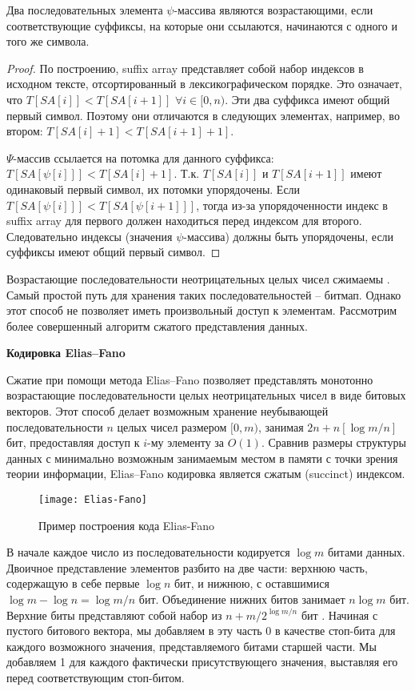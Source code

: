 \begin{theorem}
 \label{lemma:1}
 Два последовательных элемента $\psi$-массива являются возрастающими, если соответствующие суффиксы,
 на которые они ссылаются, начинаются с одного и того же символа.
\end{theorem}

\begin{proof}
 По построению, suffix array представляет собой набор индексов в исходном тексте,
 отсортированный в лексикографическом порядке. Это означает, что $T[SA[i]] < T[SA[i + 1]]$
 $\forall i \in [0, n).$ Эти два суффикса имеют общий первый символ. Поэтому они отличаются в следующих
 элементах, например, во втором: $T[SA[i] + 1] < T[SA[i + 1] + 1].$

 $\Psi$-массив ссылается на потомка для данного суффикса: $T[SA[\psi[i]]] < T[SA[i] + 1].$
 Т.к. $T[SA[i]]$ и $T[SA[i + 1]]$ имеют одинаковый первый символ, их потомки упорядочены.
 Если $T[SA[\psi[i]]] < T[SA[\psi[i + 1]]]$, тогда из-за упорядоченности индекс в suffix array
 для первого должен находиться перед индексом для второго. Следовательно индексы (значения $\psi$-массива)
 должны быть упорядочены, если суффиксы имеют общий первый символ.
\end{proof}

Возрастающие последовательности неотрицательных целых чисел сжимаемы \cite{andersensimple}.
Самый простой путь для хранения таких последовательностей -- битмап.
Однако этот способ не позволяет иметь произвольный доступ к элементам.
Рассмотрим более совершенный алгоритм сжатого представления данных.

\textbf{Кодировка Elias--Fano}

Сжатие при помощи метода Elias--Fano \cite{pibiri2014dynamic}
позволяет представлять монотонно возрастающие последовательности
целых неотрицательных чисел в виде битовых векторов. Этот способ делает возможным
хранение неубывающей последовательности $n$ целых чисел размером $[0, m)$,
занимая $2n + n[\log m/n]$ бит, предоставляя доступ к $i$-му элементу за $O(1)$.
Сравнив размеры структуры данных с минимально возможным занимаемым местом в памяти
с точки зрения теории информации, Elias--Fano кодировка является сжатым (succinct) индексом.

\begin{figure}[t]
 \texttt{[image: Elias-Fano]}
 \caption{Пример построения кода Elias-Fano}
 \centering
 \label{fig:EF}
\end{figure}

В начале каждое число из последовательности кодируется $\log m$ битами данных.
Двоичное представление элементов разбито на две части: верхнюю часть, содержащую в себе
первые $\log n$ бит, и нижнюю, с оставшимися $\log m - \log n = \log m / n$ бит.
Объединение нижних битов занимает $n \log m$ бит. Верхние биты представляют собой
набор из $n + m / 2^{\log m/n}$ бит \cite{antonio2018integers}.
Начиная с пустого битового вектора, мы добавляем в эту часть 0
в качестве стоп-бита для каждого возможного значения, представляемого битами старшей части.
Мы добавляем 1 для каждого фактически присутствующего значения, выставляя его перед соответствующим стоп-битом.

